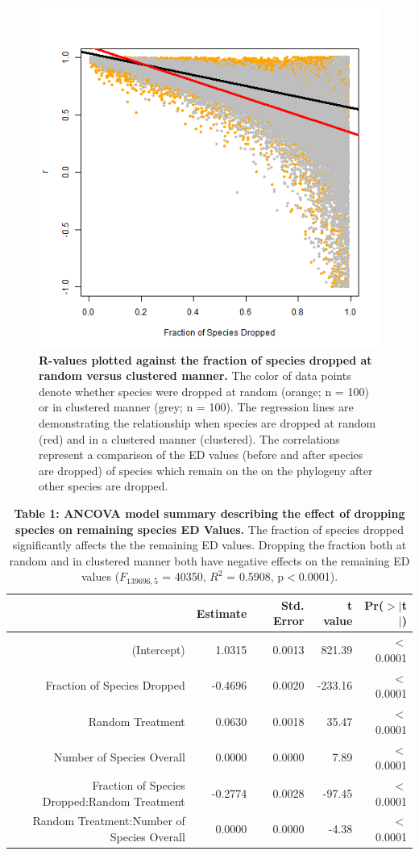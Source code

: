\documentclass[12pt,english]{article}
\begin{document}
\begin{figure}[!ht]
  \center
  \includegraphics[width=.5\textwidth]{randomVsCluster.png}
  \caption{\textbf{R-values plotted against the fraction of species dropped at
  random versus clustered manner.} The color of data points denote whether
  species were dropped at random (orange; n = 100) or in clustered manner
  (grey; n = 100). The regression lines are demonstrating the relationship when
  species are dropped at random (red) and in a clustered manner (clustered). The
  correlations represent a comparison of the ED values (before and after
  species are dropped) of species which remain on the on the phylogeny after
  other species are dropped. 
  }
  \label{randomVsClustered}
\end{figure}

\begin{table}[ht]
  \centering
  \begin{tabular}{rrrrr}
    \hline
      & Estimate & Std. Error & t value & Pr($>$$|$t$|$) \\
      \hline
      (Intercept) & 1.0315 & 0.0013 & 821.39 & $<$0.0001 \\
      Fraction of Species Dropped & -0.4696 & 0.0020 & -233.16 & $<$0.0001 \\
      Random Treatment & 0.0630 & 0.0018 & 35.47 & $<$0.0001 \\
      Number of Species Overall & 0.0000 & 0.0000 & 7.89 & $<$0.0001 \\
      Fraction of Species Dropped:Random Treatment & -0.2774 & 0.0028 & -97.45 & $<$0.0001 \\
      Random Treatment:Number of Species Overall & 0.0000 & 0.0000 & -4.38 & $<$0.0001 \\
      \hline
    \hline
  \end{tabular}
\caption*{\textbf{Table 1: ANCOVA model summary describing the effect of
dropping species on remaining species ED Values.} The fraction of species
dropped significantly affects the the remaining ED values. Dropping the
fraction both at random and in clustered manner both have negative effects on
the remaining ED values ($F_{139696, 5}$ = 40350, $R^{2}$ = 0.5908,
p$<$0.0001).}
\end{table}
\end{document}
